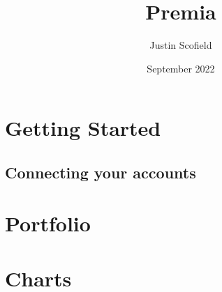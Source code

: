 \documentclass[12pt, oneside]{report}
\title{Premia}
\author{Justin Scofield}
\date{September 2022}
\begin{document}
\maketitle

\tableofcontents

\chapter{Getting Started}
\section{Connecting your accounts}

\chapter{Portfolio}
\chapter{Charts}
\end{document}
